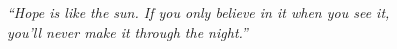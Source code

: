 \thispagestyle{empty}
\vspace*{0.22\textheight}

\begin{center}
    {\fontsize{16pt}{20pt}\selectfont\itshape
    ``Hope is like the sun. If you only believe in it when you see it,\\
    you’ll never make it through the night.''\par}
\end{center}